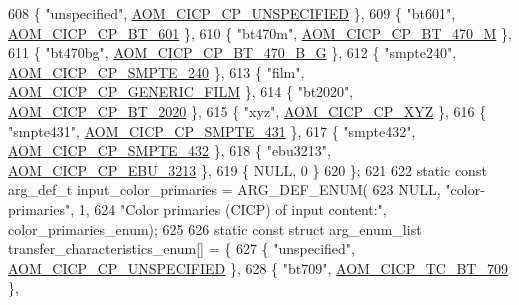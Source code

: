 \begin{DoxyCodeInclude}
{{{{{{{608   \{ \textcolor{stringliteral}{"unspecified"}, \hyperlink{aom__image_8h_a5267ad095a088ece3499336812503cefa0835a3af8e6ffc6df298b6e64f878431}{AOM\_CICP\_CP\_UNSPECIFIED} \},
609   \{ \textcolor{stringliteral}{"bt601"}, \hyperlink{aom__image_8h_a5267ad095a088ece3499336812503cefa3ce81eb125550ec2f11a58f183eeaee6}{AOM\_CICP\_CP\_BT\_601} \},
610   \{ \textcolor{stringliteral}{"bt470m"}, \hyperlink{aom__image_8h_a5267ad095a088ece3499336812503cefa5b57cb26f04f4df6585335129392d5e2}{AOM\_CICP\_CP\_BT\_470\_M} \},
611   \{ \textcolor{stringliteral}{"bt470bg"}, \hyperlink{aom__image_8h_a5267ad095a088ece3499336812503cefa8b33dc8483c16048c606d75d9f11e38a}{AOM\_CICP\_CP\_BT\_470\_B\_G} \},
612   \{ \textcolor{stringliteral}{"smpte240"}, \hyperlink{aom__image_8h_a5267ad095a088ece3499336812503cefa1a8b2e5694489121f80a406d9da25dfb}{AOM\_CICP\_CP\_SMPTE\_240} \},
613   \{ \textcolor{stringliteral}{"film"}, \hyperlink{aom__image_8h_a5267ad095a088ece3499336812503cefa8dd6ba5106c22d149a233e73232aeb65}{AOM\_CICP\_CP\_GENERIC\_FILM} \},
614   \{ \textcolor{stringliteral}{"bt2020"}, \hyperlink{aom__image_8h_a5267ad095a088ece3499336812503cefa6bb95baf09cd6e1f3596b459712c592a}{AOM\_CICP\_CP\_BT\_2020} \},
615   \{ \textcolor{stringliteral}{"xyz"}, \hyperlink{aom__image_8h_a5267ad095a088ece3499336812503cefa6032cae72a729933a6a75e3b943a542c}{AOM\_CICP\_CP\_XYZ} \},
616   \{ \textcolor{stringliteral}{"smpte431"}, \hyperlink{aom__image_8h_a5267ad095a088ece3499336812503cefa54d519c9ac0ca52ebda7caf736530e57}{AOM\_CICP\_CP\_SMPTE\_431} \},
617   \{ \textcolor{stringliteral}{"smpte432"}, \hyperlink{aom__image_8h_a5267ad095a088ece3499336812503cefa227b6e4116ed0266af20b705aebaf661}{AOM\_CICP\_CP\_SMPTE\_432} \},
618   \{ \textcolor{stringliteral}{"ebu3213"}, \hyperlink{aom__image_8h_a5267ad095a088ece3499336812503cefa9e74dcb338953bfab3101aa33ea44157}{AOM\_CICP\_CP\_EBU\_3213} \},
619   \{ NULL, 0 \}
620 \};
621 
622 \textcolor{keyword}{static} \textcolor{keyword}{const} arg\_def\_t input\_color\_primaries = ARG\_DEF\_ENUM(
623     NULL, \textcolor{stringliteral}{"color-primaries"}, 1,
624     \textcolor{stringliteral}{"Color primaries (CICP) of input content:"}, color\_primaries\_enum);
625 
626 \textcolor{keyword}{static} \textcolor{keyword}{const} \textcolor{keyword}{struct }arg\_enum\_list transfer\_characteristics\_enum[] = \{
627   \{ \textcolor{stringliteral}{"unspecified"}, \hyperlink{aom__image_8h_a5267ad095a088ece3499336812503cefa0835a3af8e6ffc6df298b6e64f878431}{AOM\_CICP\_CP\_UNSPECIFIED} \},
628   \{ \textcolor{stringliteral}{"bt709"}, \hyperlink{aom__image_8h_a30655997e3fb79889ee23eb294cb1992affe340e422646b7d70ef91edd6a8053c}{AOM\_CICP\_TC\_BT\_709} \},
}}}}}}}
\end{DoxyCodeInclude}
